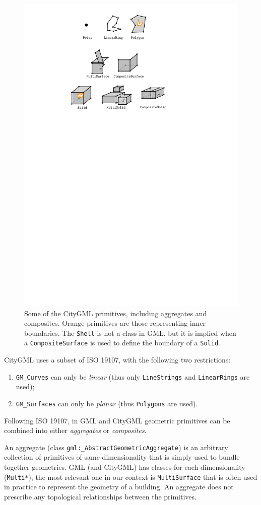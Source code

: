 \begin{figure}
  \centering
  \includegraphics[width=0.7\linewidth]{figs/geomprimitives.pdf}
  \caption{Some of the CityGML primitives, including aggregates and composites. Orange primitives are those representing inner boundaries. The \texttt{Shell} is not a class in GML, but it is implied when a \texttt{CompositeSurface} is used to define the boundary of a \texttt{Solid}.}%
\label{fig:geomprimitives}
\end{figure}

%

CityGML uses a subset of ISO 19107, with the following two restrictions: 
\begin{enumerate}
  \item \texttt{GM\_Curves} can only be \emph{linear} (thus only \texttt{LineStrings} and \texttt{LinearRings} are used); 
  \item \texttt{GM\_Surfaces} can only be \emph{planar} (thus \texttt{Polygons} are used).
\end{enumerate}

%

Following ISO 19107, in GML and CityGML geometric primitives can be combined into either \emph{aggregates} or \emph{composites}.

An aggregate (class \texttt{gml:\_AbstractGeometricAggregate}) is an arbitrary collection of primitives of same dimensionality that is simply used to bundle together geometries.
GML (and CityGML) has classes for each dimensionality (\texttt{Multi*}), the most relevant one in our context is \texttt{MultiSurface} that is often used in practice to represent the geometry of a building.
An aggregate does not prescribe any topological relationships between the primitives.

